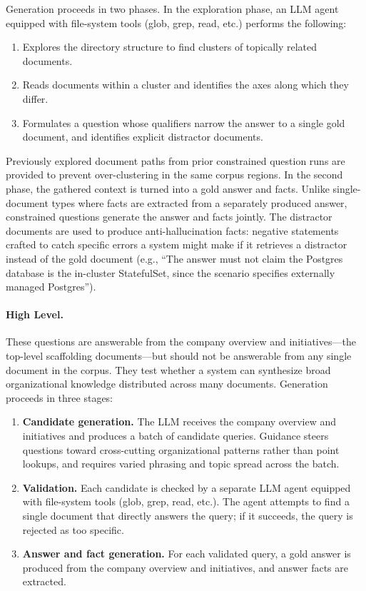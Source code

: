 \documentclass{article}
\begin{document}
Generation proceeds in two phases. In the exploration phase, an LLM agent equipped with file-system tools (glob, grep, read, etc.) performs the following:

\begin{enumerate}[leftmargin=2em]
  \item Explores the directory structure to find clusters of topically related documents.
  \item Reads documents within a cluster and identifies the axes along which they differ.
  \item Formulates a question whose qualifiers narrow the answer to a single gold document, and identifies explicit distractor documents.
\end{enumerate}

Previously explored document paths from prior constrained question runs are provided to prevent over-clustering in the same corpus regions. In the second phase, the gathered context is turned into a gold answer and facts. Unlike single-document types where facts are extracted from a separately produced answer, constrained questions generate the answer and facts jointly. The distractor documents are used to produce anti-hallucination facts: negative statements crafted to catch specific errors a system might make if it retrieves a distractor instead of the gold document (e.g., ``The answer must not claim the Postgres database is the in-cluster StatefulSet, since the scenario specifies externally managed Postgres'').

\paragraph{High Level.}
These questions are answerable from the company overview and initiatives---the top-level scaffolding documents---but should not be answerable from any single document in the corpus. They test whether a system can synthesize broad organizational knowledge distributed across many documents. Generation proceeds in three stages:

\begin{enumerate}[leftmargin=2em]
  \item \textbf{Candidate generation.} The LLM receives the company overview and initiatives and produces a batch of candidate queries. Guidance steers questions toward cross-cutting organizational patterns rather than point lookups, and requires varied phrasing and topic spread across the batch.
  \item \textbf{Validation.} Each candidate is checked by a separate LLM agent equipped with file-system tools (glob, grep, read, etc.). The agent attempts to find a single document that directly answers the query; if it succeeds, the query is rejected as too specific.
  \item \textbf{Answer and fact generation.} For each validated query, a gold answer is produced from the company overview and initiatives, and answer facts are extracted.
\end{enumerate}
\end{document}
